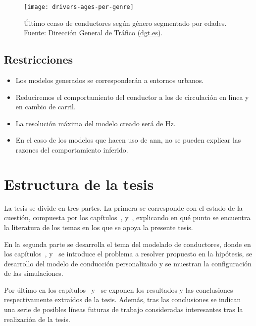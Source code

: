 \begin{figure}[b]
	\centering
	\texttt{[image: drivers-ages-per-genre]}
	\caption[Censo de conductores según género y edad]{Último censo de conductores según género segmentado por edades. Fuente: Dirección General de Tráfico (\url{dgt.es}).}
	\label{fig:drivers-ages-per-genre}
\end{figure}
\subsection{Restricciones}

\begin{itemize}
	\item Los modelos generados se corresponderán a entornos urbanos.
	\item Reduciremos el comportamiento del conductor a los de circulación en línea y en cambio de carril.
	\item La resolución máxima del modelo creado será de \unit[10]{Hz}.
	\item En el caso de los modelos que hacen uso de \acrlong{ann}, no se pueden explicar las razones del comportamiento inferido.
\end{itemize}

\section{Estructura de la tesis}
\label{ch:intro:structure}


La tesis se divide en tres partes. La primera se corresponde con el estado de la cuestión, compuesta por los capítulos~,  y~, explicando en qué punto se encuentra la literatura de los temas en los que se apoya la presente tesis.

En la segunda parte se desarrolla el tema del modelado de conductores, donde en los capítulos~,  y~ se introduce el problema a resolver propuesto en la hipótesis, se desarrollo del modelo de conducción personalizado y se muestran la configuración de las simulaciones.

Por último en los capítulos~ y~ se exponen los resultados y las conclusiones respectivamente extraídos de la tesis. Además, tras las conclusiones se indican una serie de posibles líneas futuras de trabajo consideradas interesantes tras la realización de la tesis.
